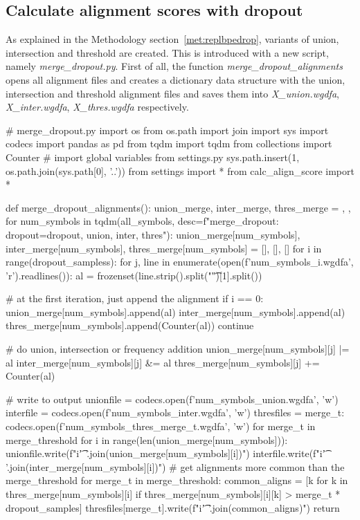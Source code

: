 \subsection{Calculate alignment scores with dropout}

As explained in the Methodology section~\ref{met:replbpedrop}, variants of union, intersection and threshold are created. This is introduced with a new script, namely \emph{merge\_dropout.py}. First of all, the function \emph{merge\_dropout\_alignments} opens all alignment files and creates a dictionary data structure with the union, intersection and threshold alignment files and saves them into \emph{X\_union.wgdfa}, \emph{X\_inter.wgdfa}, \emph{X\_thres.wgdfa} respectively.

\begin{python}
# merge_dropout.py
import os
from os.path import join
import sys
import codecs
import pandas as pd
from tqdm import tqdm
from collections import Counter
# import global variables from settings.py
sys.path.insert(1, os.path.join(sys.path[0], '..'))
from settings import *
from calc_align_score import *

def merge_dropout_alignments():
  union_merge, inter_merge, thres_merge = {}, {}, {}
  for num_symbols in tqdm(all_symbols, desc=f"merge_dropout: dropout={dropout}, union, inter, thres"):
    union_merge[num_symbols], inter_merge[num_symbols], thres_merge[num_symbols] = [], [], []
    for i in range(dropout_sampless):
      for j, line in enumerate(open(f'{num_symbols}_{i}.wgdfa', 'r').readlines()):
        al = frozenset(line.strip().split("\t")[1].split())

        # at the first iteration, just append the alignment
        if i == 0:
          union_merge[num_symbols].append(al)
          inter_merge[num_symbols].append(al)
          thres_merge[num_symbols].append(Counter(al))
          continue
        
        # do union, intersection or frequency addition
        union_merge[num_symbols][j] |= al
        inter_merge[num_symbols][j] &= al
        thres_merge[num_symbols][j] += Counter(al)

    # write to output
    unionfile = codecs.open(f'{num_symbols}_union.wgdfa', 'w')
    interfile = codecs.open(f'{num_symbols}_inter.wgdfa', 'w')
    thresfiles = {merge_t: codecs.open(f'{num_symbols}_thres_{merge_t}.wgdfa', 'w') for merge_t in merge_threshold}
    for i in range(len(union_merge[num_symbols])):
      unionfile.write(f"{i}\t{' '.join(union_merge[num_symbols][i])}\n")
      interfile.write(f"{i}\t{' '.join(inter_merge[num_symbols][i])}\n")
      # get alignments more common than the merge_threshold %
      for merge_t in merge_threshold:
        common_aligns = [k for k in thres_merge[num_symbols][i] 
                        if thres_merge[num_symbols][i][k] > merge_t * dropout_samples]
        thresfiles[merge_t].write(f"{i}\t{' '.join(common_aligns)}\n")
  return
\end{python}

